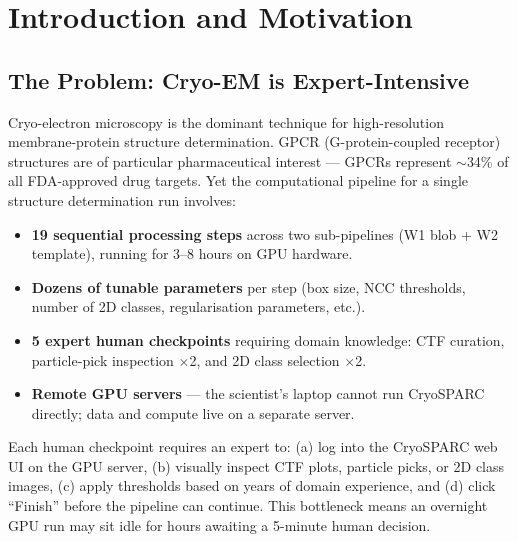\documentclass[12pt, a4paper]{article}
\begin{document}
\clearpage
\tableofcontents
\clearpage

\section{Introduction and Motivation}
\label{sec:intro}

\subsection{The Problem: Cryo-EM is Expert-Intensive}

Cryo-electron microscopy is the dominant technique for high-resolution
membrane-protein structure determination.
GPCR (G-protein-coupled receptor) structures are of particular pharmaceutical
interest --- GPCRs represent $\sim$34\% of all FDA-approved drug targets.
Yet the computational pipeline for a single structure determination run involves:

\begin{itemize}[leftmargin=1.6em, itemsep=3pt]
  \item \textbf{19 sequential processing steps} across two sub-pipelines
        (W1 blob + W2 template), running for 3--8 hours on GPU hardware.
  \item \textbf{Dozens of tunable parameters} per step (box size, NCC
        thresholds, number of 2D classes, regularisation parameters, etc.).
  \item \textbf{5 expert human checkpoints} requiring domain knowledge:
        CTF curation, particle-pick inspection $\times$2, and 2D class
        selection $\times$2.
  \item \textbf{Remote GPU servers} --- the scientist's laptop cannot run
        CryoSPARC directly; data and compute live on a separate server.
\end{itemize}

\begin{tcolorbox}[
  colback=cpcolor!60, colframe=checkpointyellow,
  arc=4pt, boxrule=0.8pt,
  title={\small\bfseries Core Challenge},
  fonttitle=\bfseries\small
]
\small
Each human checkpoint requires an expert to:
(a) log into the CryoSPARC web UI on the GPU server,
(b) visually inspect CTF plots, particle picks, or 2D class images,
(c) apply thresholds based on years of domain experience, and
(d) click ``Finish'' before the pipeline can continue.
This bottleneck means an overnight GPU run may sit idle for hours awaiting a
5-minute human decision.
\end{tcolorbox}
\end{document}
